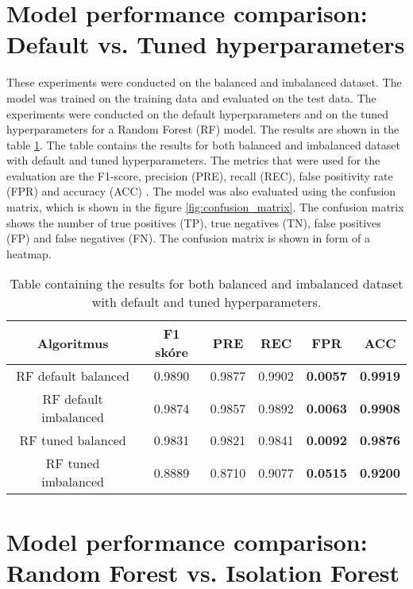 \section{Model performance comparison: Default vs. Tuned hyperparameters}

These experiments were conducted on the balanced and imbalanced dataset. The model was trained on the training data and evaluated on the test data.
The experiments were conducted on the default hyperparameters and on the tuned hyperparameters for a Random Forest (RF) model.
The results are shown in the table \ref{result_normal}.
The table contains the results for both balanced and imbalanced dataset with default and tuned hyperparameters. The metrics 
that were used for the evaluation are the F1-score, precision (PRE), recall (REC), false positivity rate (FPR) and accuracy (ACC) . 
The model was also evaluated using the confusion matrix, which is shown in the figure \ref{fig:confusion_matrix}. The confusion matrix shows the number of true positives (TP), true negatives (TN), false positives (FP) and false negatives (FN). 
The confusion matrix is shown in form of a heatmap.

\begin{table}[h]
    \centering
    \label{result_normal}
    \begin{tabular}{|c|c|c|c|c|c|}
    \hline
    \textbf{Algoritmus} & \textbf{F1 skóre} & \textbf{PRE} & \textbf{REC} & \textbf{FPR} & \textbf{ACC} \\ \hline
    RF default balanced       & 0.9890 & 0.9877 & 0.9902 & \textbf{0.0057} & \textbf{0.9919}\\ \hline
    RF default imbalanced     & 0.9874 & 0.9857 & 0.9892 & \textbf{0.0063} & \textbf{0.9908}\\ \hline
    RF tuned balanced         & 0.9831 & 0.9821 & 0.9841 & \textbf{0.0092} & \textbf{0.9876}\\ \hline
    RF tuned imbalanced       & 0.8889 & 0.8710 & 0.9077 & \textbf{0.0515} & \textbf{0.9200}\\ \hline
    \end{tabular}
    \caption{Table containing the results for both balanced and imbalanced dataset with default and tuned hyperparameters.}    
\end{table}

\section{Model performance comparison: Random Forest vs. Isolation Forest}

